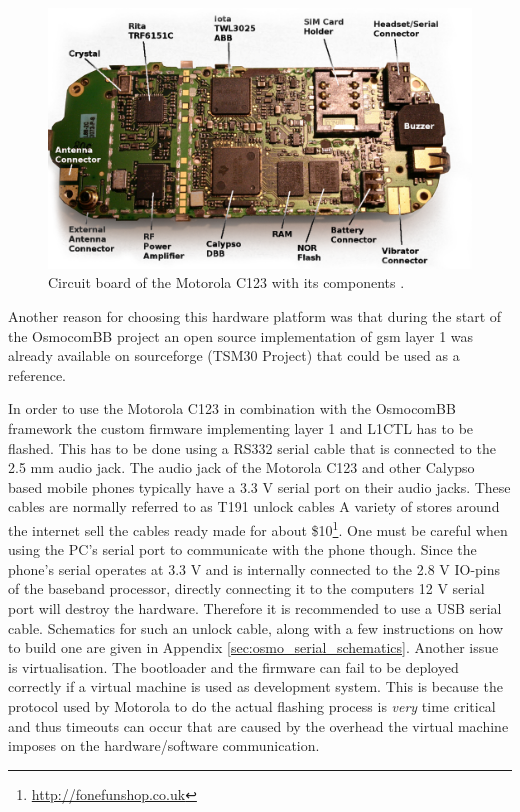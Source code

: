 \begin{figure}
\centering
	\includegraphics[width=.9\textwidth]{../Images/c123_pcb}
	\caption{Circuit board of the Motorola C123 with its components \cite{osmo_wiki_c123}.}
	\label{fig:osmo_c123}
\end{figure}
Another reason for choosing this hardware platform was that during the start of the OsmocomBB project an open source implementation of \gls{gsm} layer 1 was already available on sourceforge (TSM30 Project) that could be used as a reference.

In order to use the Motorola C123 in combination with the OsmocomBB framework the custom firmware implementing layer 1 and L1CTL has to be flashed.
This has to be done using a RS332 serial cable that is connected to the 2.5 mm audio jack.
The audio jack of the Motorola C123 and other Calypso based mobile phones typically have a 3.3 V serial port on their audio jacks.
These cables are normally referred to as T191 unlock cables 
A variety of stores around the internet sell the cables ready made for about \$10\footnote{\url{http://fonefunshop.co.uk}}.
One must be careful when using the PC's serial port to communicate with the phone though.
Since the phone's serial operates at 3.3 V and is internally connected to the 2.8 V IO-pins of the baseband processor, directly connecting it to the computers 12 V serial port will destroy the hardware.
Therefore it is recommended to use a USB serial cable.
Schematics for such an unlock cable, along with a few instructions on how to build one are given in Appendix \ref{sec:osmo_serial_schematics}.
Another issue is virtualisation.
The bootloader and the firmware can fail to be deployed correctly if a virtual machine is used as development system.
This is because the protocol used by Motorola to do the actual flashing process is \emph{very} time critical and thus timeouts can occur that are caused by the overhead the virtual machine imposes on the hardware/software communication.

